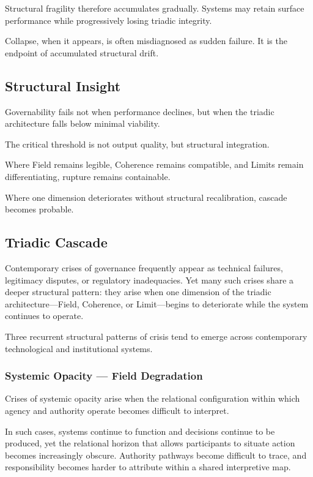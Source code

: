 \documentclass[12pt]{article}
\begin{document}
Structural fragility therefore accumulates gradually. Systems may retain surface performance while progressively losing triadic integrity.

Collapse, when it appears, is often misdiagnosed as sudden failure. It is the endpoint of accumulated structural drift.

\subsection{Structural Insight}


Governability fails not when performance declines, but when the triadic architecture falls below minimal viability.

The critical threshold is not output quality, but structural integration.

Where Field remains legible, Coherence remains compatible, and Limits remain differentiating, rupture remains containable.

Where one dimension deteriorates without structural recalibration, cascade becomes probable.

\subsection{Triadic Cascade}


Contemporary crises of governance frequently appear as technical failures, legitimacy disputes, or regulatory inadequacies. Yet many such crises share a deeper structural pattern: they arise when one dimension of the triadic architecture—Field, Coherence, or Limit—begins to deteriorate while the system continues to operate.

Three recurrent structural patterns of crisis tend to emerge across contemporary technological and institutional systems.

\subsubsection{Systemic Opacity — Field Degradation}


Crises of systemic opacity arise when the relational configuration within which agency and authority operate becomes difficult to interpret.

In such cases, systems continue to function and decisions continue to be produced, yet the relational horizon that allows participants to situate action becomes increasingly obscure. Authority pathways become difficult to trace, and responsibility becomes harder to attribute within a shared interpretive map.
\end{document}
